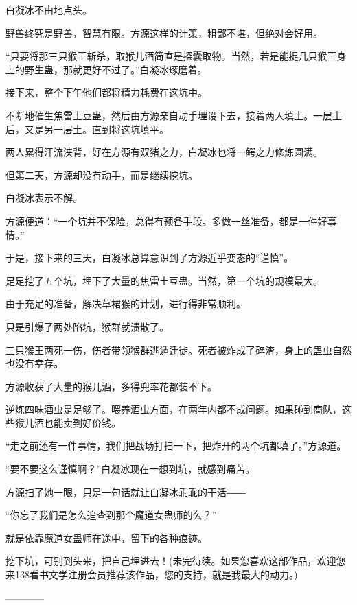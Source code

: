 \begin{this_body}
白凝冰不由地点头。

野兽终究是野兽，智慧有限。方源这样的计策，粗鄙不堪，但绝对会好用。

“只要将那三只猴王斩杀，取猴儿酒简直是探囊取物。当然，若是能捉几只猴王身上的野生蛊，那就更好不过了。”白凝冰琢磨着。

接下来，整个下午他们都将精力耗费在这坑中。

不断地催生焦雷土豆蛊，然后由方源亲自动手埋设下去，接着两人填土。一层土后，又是另一层土。直到将这坑填平。

两人累得汗流浃背，好在方源有双猪之力，白凝冰也将一鳄之力修炼圆满。

但第二天，方源却没有动手，而是继续挖坑。

白凝冰表示不解。

方源便道：“一个坑并不保险，总得有预备手段。多做一丝准备，都是一件好事情。”

于是，接下来的三天，白凝冰总算意识到了方源近乎变态的“谨慎”。

足足挖了五个坑，埋下了大量的焦雷土豆蛊。当然，第一个坑的规模最大。

由于充足的准备，解决草裙猴的计划，进行得非常顺利。

只是引爆了两处陷坑，猴群就溃散了。

三只猴王两死一伤，伤者带领猴群逃遁迁徙。死者被炸成了碎渣，身上的蛊虫自然也没有幸存。

方源收获了大量的猴儿酒，多得兜率花都装不下。

逆炼四味酒虫是足够了。喂养酒虫方面，在两年内都不成问题。如果碰到商队，这些猴儿酒也能卖到好价钱。

“走之前还有一件事情，我们把战场打扫一下，把炸开的两个坑都填了。”方源道。

“要不要这么谨慎啊？”白凝冰现在一想到坑，就感到痛苦。

方源扫了她一眼，只是一句话就让白凝冰乖乖的干活――

“你忘了我们是怎么追查到那个魔道女蛊师的么？”

就是依靠魔道女蛊师在途中，留下的各种痕迹。

挖下坑，可别到头来，把自己埋进去！(未完待续。如果您喜欢这部作品，欢迎您来138看书文学注册会员推荐该作品，您的支持，就是我最大的动力。)

------------

\end{this_body}

